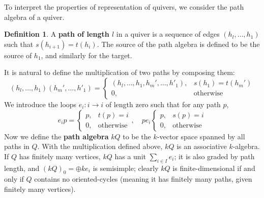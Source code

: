 \documentclass[12pt]{report}
\theoremstyle{remark}
\theoremstyle{definition}
\newtheorem{definition}{Definition}[section]
\begin{document}
    To interpret the properties of representation of quivers, we consider the path algebra of a quiver.
    \begin{definition}
        A \textbf{path of length $l$} in a quiver is a sequence of edges $(h_l,\dots, h_1)$ such that $s(h_{i+1})=t(h_i)$. The source of the path algebra is defined to be the source of $h_1$, and similarly for the target.
    \end{definition}
    It is natural to define the multiplication of two paths by composing them:
    \[(h_l,\dots, h_1)(h_m',\dots, h'_1)=\begin{cases}
        (h_l,\dots, h_1, h_m',\dots, h'_1), &s(h_1)=t(h_m')\\
        0, &\text{otherwise}
    \end{cases}\]
    We introduce the loops $e_i:i\to i$ of length zero such that for any path $p$,
    \[
        e_ip=\begin{cases}
            p, &t(p)=i\\
            0, &\text{otherwise}
        \end{cases},\quad
        pe_i\begin{cases}
            p, &s(p)=i\\
            0, &\text{otherwise}
        \end{cases}
    \]
    Now we define the \textbf{path algebra} $kQ$ to be the $k$-vector space spanned by all paths in $Q$. With the multiplication defined above, $kQ$ is an associative $k$-algebra. If $Q$ has finitely many vertices, $kQ$ has a unit $\sum_{i\in I} e_i$; it is also graded by path length, and $(kQ)_0=\oplus ke_i$ is semisimple; clearly $kQ$ is finite-dimensional if and only if $Q$ contains no oriented-cycles (meaning it has finitely many paths, given finitely many vertices).
\end{document}
